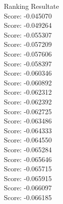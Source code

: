 \documentclass[11pt]{article}
\begin{document}
    Ranking Resultate\\
Score: -0.045070\\
Score: -0.049264\\
Score: -0.055307\\
Score: -0.057209\\
Score: -0.057606\\
Score: -0.058397\\
Score: -0.060346\\
Score: -0.060892\\
Score: -0.062312\\
Score: -0.062392\\
Score: -0.062725\\
Score: -0.063486\\
Score: -0.064333\\
Score: -0.064550\\
Score: -0.065284\\
Score: -0.065646\\
Score: -0.065715\\
Score: -0.065915\\
Score: -0.066097\\
Score: -0.066185
\end{document}
